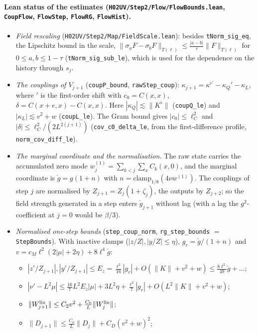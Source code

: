 \documentclass[11pt]{amsart}
\theoremstyle{definition}
\theoremstyle{remark}
\numberwithin{equation}{section}
\begin{document}
\paragraph{Lean status of the estimates (\texttt{H02UV/Step2/Flow/FlowBounds.lean}, \texttt{CoupFlow},
\texttt{FlowStep}, \texttt{FlowRG}, \texttt{FlowHist}).}
\begin{itemize}
\item \emph{Field rescaling} (\texttt{H02UV/Step2/Map/FieldScale.lean}): besides \texttt{tNorm\_sig\_eq}, the
  Lipschitz bound in the scale, $\|\sigma_aF-\sigma_bF\|_{T(\ell)}\le\frac{|a-b|}\tau\|F\|_{T(\ell)}$ for
  $0\le a,b\le1-\tau$ (\texttt{tNorm\_sig\_sub\_le}), which is used for the dependence on the history
  through $s_j$.
\item \emph{The couplings of $V_{j+1}$} (\texttt{coupP\_bound}, \texttt{rawStep\_coup}):
  $\kappa_{j+1}=\kappa^{\flat\prime}-\kappa_Q'-\kappa_L$, where $'$ is the first-order shift with
  $c_0=C(x,x)$, $\delta=C(x+e,x)-C(x,x)$. Here $|\kappa_Q|\lesssim\|K^\flat\|$ (\texttt{coupQ\_le}) and
  $|\kappa_L|\lesssim v^2+w$ (\texttt{coupL\_le}). The Gram bound gives $|c_0|\le\ell_C^2$ and
  $|\delta|\le\ell_C^2/(2L^{2(j+1)})$ (\texttt{cov\_c0\_delta\_le}, from the first-difference profile,
  \texttt{norm\_cov\_diff\_le}).
\item \emph{The marginal coordinate and the normalisation.} The raw state carries the accumulated zero
  mode $w^{(1)}_j=\sum_{k<j}\sum_xC_k(x,0)$, and the marginal coordinate is $\check g=g(1+n)$ with
  $n=\mathrm{clamp}_{1/8}(4\nu w^{(1)})$. The couplings of step $j$ are normalised by
  $Z_{j+1}=Z_j(1+\zeta_j)$, the outputs by $Z_{j+2}$; so the field strength generated in a step enters
  $\check g_{j+1}$ without lag (with a lag the $g^2$-coefficient at $j=0$ would be $\beta/3$).
\item \emph{Normalised one-step bounds} (\texttt{step\_coup\_norm}, \texttt{rg\_step\_bounds} $=$
  \texttt{StepBounds}). With inactive clamps ($|z/Z|,|y/Z|\le\eta$), $g_r=\check g/(1+n)$ and
  $v=c_M\ell^2(2|\mu|+2\eta)+8\ell^4\check g$:
  \begin{itemize}
  \item $|z'/Z_{j+1}|,|y'/Z_{j+1}|\le E_z=\frac{\ell^2}{16}|g_r|+O(\|K\|+v^2+w)\le\frac{8\ell^2}{49}\check g+\dots$;
  \item $|\nu'-L^2\mu|\le\frac{16}7L^2E_z|\mu|+3L^2\eta+\frac{\ell^2}7|g_r|+O(L^2\|K\|+v^2+w)$;
  \item $\|W^{\rm lin}_{j+1}\|\le C_2v^2+\frac{C_0}L\|W^{\rm lin}_j\|$;
  \item $\|D_{j+1}\|\le\frac{C_0}L\|D_j\|+C_D(v^2+w)^2$;

\end{itemize}
\end{itemize}
\end{document}
